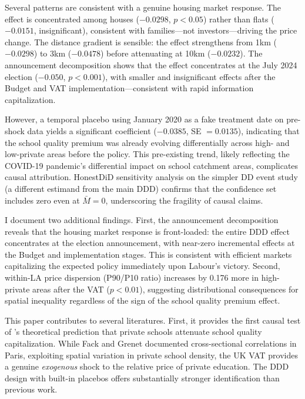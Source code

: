 \documentclass[12pt]{article}
\begin{document}
Several patterns are consistent with a genuine housing market response. The effect is concentrated among houses ($-0.0298$, $p < 0.05$) rather than flats ($-0.0151$, insignificant), consistent with families---not investors---driving the price change. The distance gradient is sensible: the effect strengthens from 1km ($-0.0298$) to 3km ($-0.0478$) before attenuating at 10km ($-0.0232$). The announcement decomposition shows that the effect concentrates at the July 2024 election ($-0.050$, $p < 0.001$), with smaller and insignificant effects after the Budget and VAT implementation---consistent with rapid information capitalization.

However, a temporal placebo using January 2020 as a fake treatment date on pre-shock data yields a significant coefficient ($-0.0385$, SE $= 0.0135$), indicating that the school quality premium was already evolving differentially across high- and low-private areas before the policy. This pre-existing trend, likely reflecting the COVID-19 pandemic's differential impact on school catchment areas, complicates causal attribution. HonestDiD sensitivity analysis on the simpler DD event study (a different estimand from the main DDD) confirms that the confidence set includes zero even at $\bar{M} = 0$, underscoring the fragility of causal claims.

I document two additional findings. First, the announcement decomposition reveals that the housing market response is front-loaded: the entire DDD effect concentrates at the election announcement, with near-zero incremental effects at the Budget and implementation stages. This is consistent with efficient markets capitalizing the expected policy immediately upon Labour's victory. Second, within-LA price dispersion (P90/P10 ratio) increases by 0.176 more in high-private areas after the VAT ($p < 0.01$), suggesting distributional consequences for spatial inequality regardless of the sign of the school quality premium effect.

This paper contributes to several literatures. First, it provides the first causal test of \citet{fack2010}'s theoretical prediction that private schools attenuate school quality capitalization. While Fack and Grenet documented cross-sectional correlations in Paris, exploiting spatial variation in private school density, the UK VAT provides a genuine \textit{exogenous} shock to the relative price of private education. The DDD design with built-in placebos offers substantially stronger identification than previous work.
\end{document}
